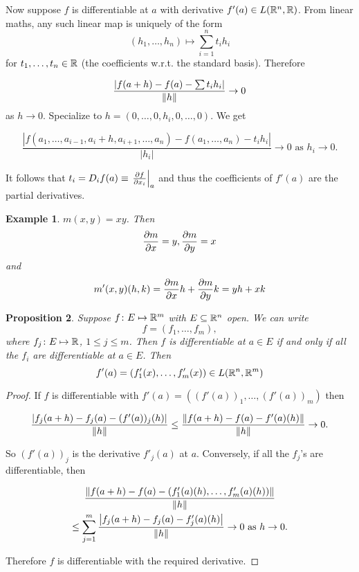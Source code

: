 \documentclass{notes}
\theoremstyle{plain}
\newtheorem{proposition}{Proposition}[chapter]
\newtheorem{example}[proposition]{Example}
\begin{document}
Now suppose $f$ is differentiable at $ a $ with derivative
$f'(a) \in L(\mathbb{R}^{n}, \mathbb{R})$.
From linear maths, any such linear map is uniquely of the form
\[
(h_{1},\ldots, h_{n}) \mapsto \sum_{i=1}^{n}t_{i}h_{i}
\]
for $ t_{1},\ldots,t_{n} \in \mathbb{R} $ (the coefficients w.r.t. the 
standard basis).  Therefore

\[
\frac{|f(a+h)-f(a)-\sum t_{i}h_{i}|}{\left\|h\right\|} \to 0 
\] as $ h \to 0 $.  Specialize to $ h=(0,\ldots,0,h_{i},0,\ldots,0)$.  We get

\[
\frac{| f(a_{1},\ldots,a_{i-1},a_{i}+h,a_{i+1},\ldots,a_{n}) - 
f(a_{1},\ldots,a_{n}) - t_{i}h_{i}|}{|h_{i}|} \to 0 \text{ as } h_i
\to 0.
 \]

It follows that $ t_{i} = D_{i}f(a) \equiv \left.\frac{\partial f}{\partial x_{i}}\right|_{a}$
and thus the coefficients of $ f'(a) $ are the partial derivatives.

\begin{example}
$ m(x,y)=xy $. Then \[ \frac{\partial m}{\partial x}=y, \frac{\partial m}{\partial y}=x \] and \[
m'(x,y)(h,k) = \frac{\partial m}{\partial x}h + \frac{\partial m}{\partial y}k = yh+xk \]
\end{example}

\begin{proposition}
Suppose $ f\colon E \mapsto \mathbb{R}^{m} $ with $ E \subseteq \mathbb{R}^{n} $ open. 
We can write
\[
f=(f_{1},\ldots,f_m),
\] 
where $ f_{j}\colon E\mapsto \mathbb{R} $, $ 1 \leq j \leq m $.
Then $ f $ is differentiable at $ a \in E $ if and only if all 
the $ f_{i} $ are differentiable at $ a \in E $.  Then
\[ 
f'(a)=(f'_{1}(x),\ldots,f'_{m}(x)) \in L(\mathbb{R}^{n},\mathbb{R}^{m})
\]
\end{proposition}

\begin{proof}
If $ f $ is differentiable with
$f'(a)=  ((f'(a))_{1},\ldots,(f'(a))_{m})$ then

\[
\frac{ \left|f_{j}(a+h)-f_{j}(a)-(f'(a))_{j}(h)\right|}{\left\|h\right\|}
 \leq
\frac{ \left\| f(a+h)-f(a)-f'(a)(h)\right\|}{\left\|h\right\|} \to 0.
\]

So $ (f'(a))_{j} $ is the derivative $ f'_{j}(a) $ at $ a $.
Conversely, if all the $f_{j}$'s are differentiable, then

\begin{multline*}
\frac{ \left\|f(a+h)-f(a)-(f'_{1}(a)(h),\ldots,f'_{m}(a)(h))\right\|}{\left\|h\right\|} \\
\leq \sum_{j=1}^{m} \frac{\left|f_{j}(a+h)-f_{j}(a)-f'_{j}(a)(h)\right|}{\left\|h\right\|} 
\to 0 \text{ as } h \to 0.
\end{multline*}

Therefore $ f $ is differentiable with the required derivative.
\end{proof}
\end{document}
